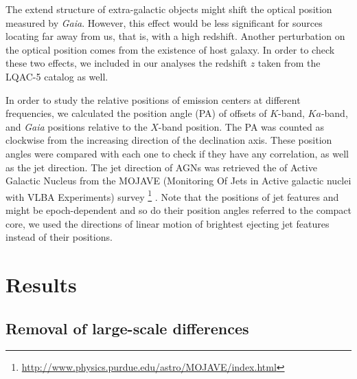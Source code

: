 \documentclass{aa}
\begin{document}
   The extend structure of extra-galactic objects might shift the optical position measured by \textit{Gaia}.
   However, this effect would be less significant for sources locating far away from us, that is, with a high redshift.
   Another perturbation on the optical position comes from the existence of host galaxy.
   In order to check these two effects, we included in our analyses the redshift $z$ taken from the LQAC-5 catalog as well.

   In order to study the relative positions of emission centers at different frequencies, we calculated the position angle (PA) of offsets of $K$-band, $Ka$-band, and \textit{Gaia} positions relative to the $X$-band position.
   The PA was counted as clockwise from the increasing direction of the declination axis.
   These position angles were compared with each one to check if they have any correlation, as well as the jet direction.
   The jet direction of AGNs was retrieved the of Active Galactic Nucleus from the MOJAVE (Monitoring Of Jets in Active galactic nuclei with VLBA Experiments) survey \footnote{\url{http://www.physics.purdue.edu/astro/MOJAVE/index.html}} \citep[][]{2019ApJ...874...43L}.
   Note that the positions of jet features and might be epoch-dependent and so do their position angles referred to the compact core, we used the directions of linear motion of brightest ejecting jet features instead of their positions.


\section{Results}    \label{sec:result}


\subsection{Removal of large-scale differences}    \label{subsec:remove-sys}
\end{document}
